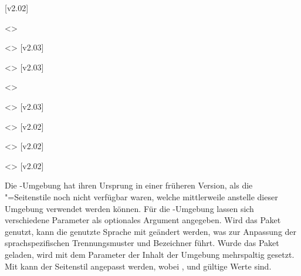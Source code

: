 \begin{DeclareEntity*}{}
\begin{DeclareEntity*}{}
\begin{DeclareEntity*}{}
\begin{Declaration}
  {}
\begin{Declaration}
  {}
\begin{Declaration}
  {}
\begin{Declaration}
  {}
  [v2.02]
\begin{Declaration}
  {}
  <>
\begin{Declaration}
  {}
  <>
  [v2.03]
\begin{Declaration}
  {}
  <>
  [v2.03]
\begin{Declaration}
  {}
  <>
\begin{Declaration}
  {}
  <>
  [v2.03]
\begin{Declaration}
  {}
  <>
  [v2.02]
\begin{Declaration}
  {}
  <>
  [v2.02]
\begin{Declaration}
  {}
  <>
  [v2.02]

Die -Umgebung hat ihren Ursprung in einer früheren 
Version, als die "=Seitenstile noch nicht verfügbar 
waren, welche mittlerweile anstelle dieser Umgebung verwendet werden können.
Für die -Umgebung lassen sich verschiedene Parameter als 
optionales Argument angegeben. Wird das Paket  genutzt, kann die 
genutzte Sprache mit 
geändert werden, was zur Anpassung der sprachspezifischen Trennungsmuster und 
Bezeichner führt. Wurde das Paket  geladen, wird mit dem 
Parameter  der Inhalt der 
Umgebung mehrspaltig gesetzt. Mit  kann 
der Seitenstil angepasst werden, wobei ,  und 
 gültige Werte sind. 


\end{Declaration}
\end{Declaration}
\end{Declaration}
\end{Declaration}
\end{Declaration}
\end{Declaration}
\end{Declaration}
\end{Declaration}
\end{Declaration}
\end{Declaration}
\end{Declaration}
\end{Declaration}
\end{DeclareEntity*}
\end{DeclareEntity*}
\end{DeclareEntity*}
